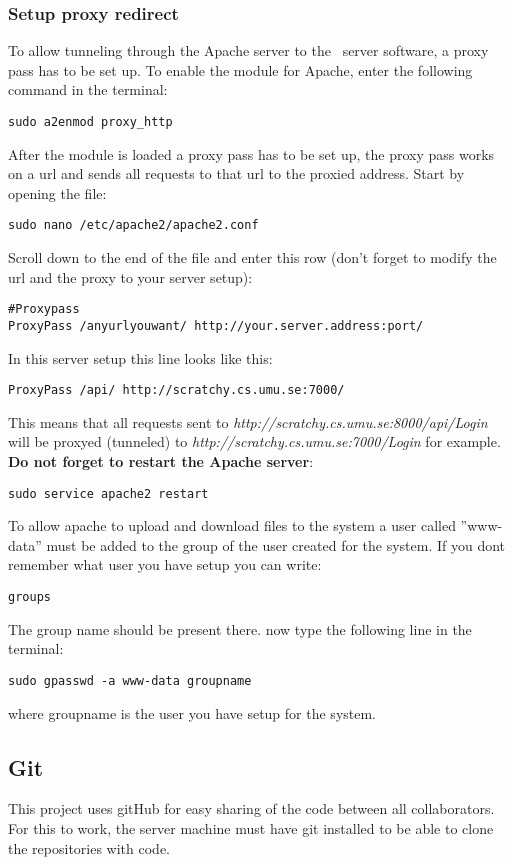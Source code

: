 \subsubsection{Setup proxy redirect}
To allow tunneling through the Apache server to the \appName\ server software, a proxy pass has to be set up.
To enable the module for Apache, enter the following command in the terminal:

\begin{verbatim}
sudo a2enmod proxy_http
\end{verbatim}
After the module is loaded a proxy pass has to be set up, the proxy pass works on a url and sends all requests to that url to the proxied address. Start by opening the file:
\begin{verbatim}
sudo nano /etc/apache2/apache2.conf
\end{verbatim}
Scroll down to the end of the file and enter this row (don't forget to modify the url and the proxy to your server setup):
\begin{verbatim}
#Proxypass 
ProxyPass /anyurlyouwant/ http://your.server.address:port/
\end{verbatim}
In this server setup this line looks like this:
\begin{verbatim}
ProxyPass /api/ http://scratchy.cs.umu.se:7000/
\end{verbatim}
This means that all requests sent to \emph{http://scratchy.cs.umu.se:8000/api/Login} will be proxyed (tunneled) to
\emph{http://scratchy.cs.umu.se:7000/Login} for example. \textbf{Do not forget to restart the Apache server}:
\begin{verbatim}
sudo service apache2 restart
\end{verbatim}

To allow apache to upload and download files to the system a user called ''www-data'' must be added to the group of the user created for the system. If you dont remember what user you have setup you can write:

\begin{verbatim}
groups
\end{verbatim}
The group name should be present there. now type the following line in the terminal:

\begin{verbatim}
sudo gpasswd -a www-data groupname
\end{verbatim}
where groupname is the user you have setup for the system.

\subsection{Git}
This project uses gitHub for easy sharing of the code between all collaborators. For this to work, the server machine must have git installed to be able to clone the repositories with code. 

